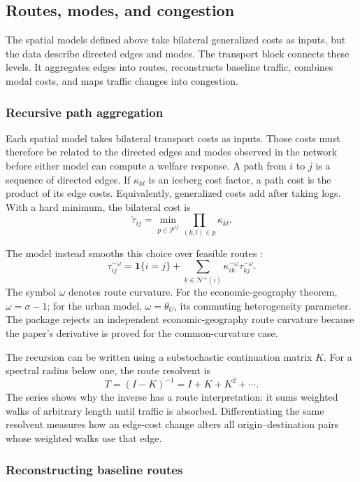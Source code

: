 \subsection{Routes, modes, and congestion}
\label{ch:routing}

The spatial models defined above take bilateral generalized costs as inputs,
but the data describe directed edges and modes. The transport block connects
these levels. It aggregates edges into routes, reconstructs baseline traffic,
combines modal costs, and maps traffic changes into congestion.

\subsubsection{Recursive path aggregation}

Each spatial model takes bilateral transport costs as inputs. Those costs
must therefore be related to the directed edges and modes observed in the
network before either model can compute a welfare response.
A path from \(i\) to \(j\) is a sequence of directed edges. If
\(\kappa_{kl}\) is an iceberg cost factor, a path cost is the product of its
edge costs. Equivalently, generalized costs add after taking logs. With a hard
minimum, the bilateral cost is
\[
 \widetilde\tau_{ij}
 =\min_{p\in\mathcal P^{ij}}\prod_{(k,l)\in p}\kappa_{kl}.
\]

The model instead smooths this choice over feasible routes
\citep{AllenFuchsWong2026}:
\[
 \tau_{ij}^{-\omega}
 =\mathbf 1\{i=j\}
  +\sum_{k\in\mathcal N^+(i)}
    \kappa_{ik}^{-\omega}\tau_{kj}^{-\omega}.
\]
The symbol \(\omega\) denotes route curvature. For the
economic-geography theorem, \(\omega=\sigma-1\); for the urban model,
\(\omega=\theta_U\), its commuting heterogeneity parameter. The package
rejects an independent economic-geography route curvature because the paper's
derivative is proved for the common-curvature case.

The recursion can be written using a substochastic continuation matrix \(K\).
For a spectral radius below one, the route resolvent is
\[
 T=(I-K)^{-1}=I+K+K^2+\cdots.
\]
The series shows why the inverse has a route interpretation: it sums weighted
walks of arbitrary length until traffic is absorbed. Differentiating the same
resolvent measures how an edge-cost change alters all origin--destination
pairs whose weighted walks use that edge.

\subsubsection{Reconstructing baseline routes}


